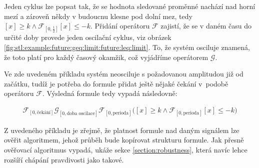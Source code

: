 Jeden cyklus lze popsat tak, že se hodnota sledované proměnné nachází nad horní mezí a zároveň někdy
v budoucnu klesne pod dolní mez, tedy $[x] \geq k \wedge \mathcal{F}_{[0, \frac{1}{2}]}[x] \leq -k$.
Přidání operátoru $\mathcal{F}$ zajistí, že se v daném času do určité doby provede jeden oscilační cyklus,
viz obrázek \ref{fig:stl:example:future:geq:limit:future:leq:limit}. To, že systém
osciluje znamená, že toto platí pro každý časový okamžik, což vyjádříme operátorem $\mathcal{G}$.

Ve zde uvedeném příkladu systém neosciluje s požadovanou amplitudou již od začátku,
tudíž je potřeba do formule přidat ještě nějaké čekání v~podobě operátoru $\mathcal{F}$.
Výsledná formule tedy vypadá následovně:

\begin{align}\label{eq:stl:lotkav:oscil}
\mathcal{F}_{[0, \textrm{čekání}]}\mathcal{G}_{[0, \textrm{doba oscilace}]}\mathcal{F}_{[0, \textrm{perioda}]}\Big([x] \geq k \wedge \mathcal{F}_{[0, \textrm{perioda}]}[x] \leq -k\Big)
\end{align}

Z uvedeného příkladu je zřejmě, že platnost formule nad daným signá\-lem
lze ověřit algoritmem, jehož průběh bude kopírovat strukturu formule. Jak
přesně ověřovací algoritmus vypadá, ukáže sekce \ref{section:robustness},
která navíc lehce rozšíří chápání pravdivosti jako takové.
